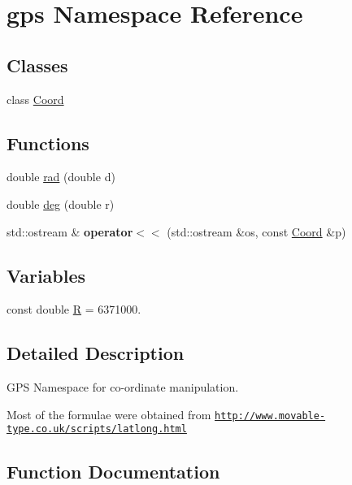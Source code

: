 \hypertarget{namespacegps}{}\section{gps Namespace Reference}
\label{namespacegps}
\subsection*{Classes}
\begin{DoxyCompactItemize}
\item 
class \hyperlink{classgps_1_1Coord}{Coord}
\end{DoxyCompactItemize}
\subsection*{Functions}
\begin{DoxyCompactItemize}
\item 
double \hyperlink{namespacegps_ad44ea39876137fc96774486e3a60f004}{rad} (double d)
\item 
double \hyperlink{namespacegps_a5c00877fe5fce323f1c834c324018c8f}{deg} (double r)
\item 
std\+::ostream \& {\bfseries operator$<$$<$} (std\+::ostream \&os, const \hyperlink{classgps_1_1Coord}{Coord} \&p)\hypertarget{namespacegps_a5fb543469635387159ce1b8e24f6f78a}{}\label{namespacegps_a5fb543469635387159ce1b8e24f6f78a}

\end{DoxyCompactItemize}
\subsection*{Variables}
\begin{DoxyCompactItemize}
\item 
const double \hyperlink{namespacegps_a336bcadf804afba736e0cf773b5a36e8}{R} = 6371000.
\end{DoxyCompactItemize}


\subsection{Detailed Description}
G\+PS Namespace for co-\/ordinate manipulation.

Most of the formulae were obtained from \href{http://www.movable-type.co.uk/scripts/latlong.html}{\tt http\+://www.\+movable-\/type.\+co.\+uk/scripts/latlong.\+html} 

\subsection{Function Documentation}
